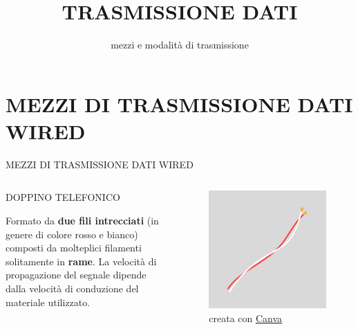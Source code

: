 \documentclass[aspectratio=1610]{beamer}
\title{TRASMISSIONE DATI}
\subtitle{mezzi e modalità di trasmissione}
\date{}
\institute{\textit{
        Fonti:
        \begin{itemize}
            \item[-] \href{https://it.wikipedia.org/wiki/Sistema_di_trasmissione_(telecomunicazioni)}{Wikipedia}
            \item[-] \href{https://www.edises.it/concorsi/scienze-e-tecnologie-informatiche-2020.html}{Manuale scienze e tecnologie informatiche}
            \item[-] \href{https://www.fastweb.it/fastweb-plus/digital-magazine/spettro-elettromagnetico-bande-di-frequenza-delle-telecomunicazioni/}{Fastweb Plus}
        \end{itemize}
    }
}
\begin{document}
\begin{frame}
    \titlepage
\end{frame}


\section{MEZZI DI TRASMISSIONE DATI WIRED}

\begin{frame}{MEZZI DI TRASMISSIONE DATI WIRED}
    \begin{columns}
        \begin{alertblock}{DOPPINO TELEFONICO}
            \begin{minipage}{0.97\linewidth}
                \justifying
                Formato da \textbf{due fili intrecciati} (in genere di colore rosso e bianco) composti da 
                molteplici filamenti solitamente in \textbf{rame}. La velocità di propagazione del segnale 
                dipende dalla velocità di conduzione del materiale utilizzato.
            \end{minipage}
        \end{alertblock}
           \begin{figure}
               \includegraphics[width=\linewidth]{img/doppino_telefonico.png}
               \caption{{creata con \href{https://www.canva.com/}{Canva}}}
           \end{figure}
    \end{columns}
\end{frame}
\end{document}
